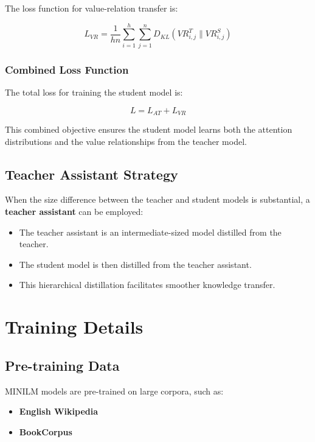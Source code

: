 \documentclass{article}
\begin{document}
The loss function for value-relation transfer is:  
  
\begin{equation}  
    L_{VR} = \frac{1}{h n} \sum_{i=1}^{h} \sum_{j=1}^{n} D_{KL}\left( VR^T_{i,j} \| VR^S_{i,j} \right)  
\end{equation}  
  
\subsubsection{Combined Loss Function}  
  
The total loss for training the student model is:  
  
\begin{equation}  
    L = L_{AT} + L_{VR}  
\end{equation}  
  
This combined objective ensures the student model learns both the attention distributions and the value relationships from the teacher model.  
  
\subsection{Teacher Assistant Strategy}  
  
When the size difference between the teacher and student models is substantial, a \textbf{teacher assistant} can be employed:  
  
\begin{itemize}  
    \item The teacher assistant is an intermediate-sized model distilled from the teacher.  
    \item The student model is then distilled from the teacher assistant.  
    \item This hierarchical distillation facilitates smoother knowledge transfer.  
\end{itemize}  
  
\section{Training Details}  
  
\subsection{Pre-training Data}  
  
MINILM models are pre-trained on large corpora, such as:  
  
\begin{itemize}  
    \item \textbf{English Wikipedia}  
    \item \textbf{BookCorpus} \cite{zhu2015aligning}  
\end{itemize}  
  
\end{document}
